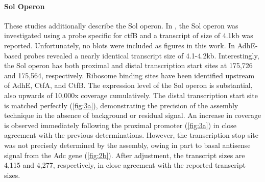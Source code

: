 \paragraph{Sol Operon}
These studies additionally describe the Sol operon. In \cite{65}, the Sol operon was investigated using a probe specific for ctfB and a transcript of size of 4.1kb was reported. Unfortunately, no blots were included as figures in this work. In \cite{63} AdhE-based probes revealed a nearly identical transcript size of 4.1-4.2kb. Interestingly, the Sol operon has both proximal and distal transcription start sites at 175,726 and 175,564, respectively\cite{62,63}. Ribosome binding sites have been identified upstream of AdhE, CtfA, and CtfB\cite{63}. The expression level of the Sol operon is substantial, also upwards of 10,000x coverage cumulatively. The distal transcription start site is matched perfectly (\ref{fig:3a}), demonstrating the precision of the assembly technique in the absence of background or residual signal. An increase in coverage is observed immediately following the proximal promoter (\ref{fig:3a}) in close agreement with the previous determinations\cite{62,63}. However, the transcription stop site was not precisely determined by the assembly, owing in part to basal antisense signal from the Adc gene (\ref{fig:2b}). After adjustment, the transcript sizes are 4,115 and 4,277, respectively, in close agreement with the reported transcript sizes\cite{63,65}.

